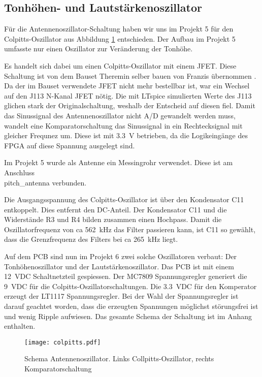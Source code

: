 \subsection{Tonhöhen- und Lautstärkenoszillator}\label{subsec:Antennenoszilator}
Für die Antennenoszillator-Schaltung haben wir uns im Projekt 5 für den Colpitts-Oszillator aus Abbildung \ref{img:colpitts} entschieden. Der Aufbau im Projekt 5 umfasste nur einen Oszillator zur Veränderung der Tonhöhe.

Es handelt sich dabei um einen Colpitts-Oszillator mit einem JFET. Diese Schaltung ist von dem Bauset \glqq Theremin selber bauen\grqq{} von Franzis übernommen \cite{Franzis}. 
Da der im Bauset verwendete JFET nicht mehr bestellbar ist, war ein Wechsel auf den J113 N-Kanal JFET nötig. Die mit LTspice simulierten Werte des J113 glichen stark der Originalschaltung, weshalb der Entscheid auf diesen fiel. 
Damit das Sinussignal des Antennenoszillator nicht A/D gewandelt werden muss, wandelt eine Komparatorschaltung das Sinussignal in ein Rechtecksignal mit gleicher Frequnez um. 
Diese ist mit \SI{3.3}{V} betrieben, da die Logikeingänge des FPGA auf diese Spannung ausgelegt sind. 

Im Projekt 5 wurde als Antenne ein Messingrohr verwendet. Diese ist am Anschluss\\ pitch\_antenna verbunden. 

Die Ausgangsspannung des Colpitts-Oszillator ist über den Kondensator C11 entkoppelt. Dies entfernt den DC-Anteil. Der Kondensator C11 und die Widerstände R3 und R4 bilden zusammen einen Hochpass. Damit die Oszillatorfrequenz von ca \SI{562}{kHz} das Filter passieren kann, ist C11 so gewählt, dass die Grenzfrequenz des Filters bei ca \SI{265}{kHz} liegt. 

Auf dem PCB sind nun im Projekt 6 zwei solche Oszillatoren verbaut: Der Tonhöhenoszillator und der Lautstärkenoszillator. Das PCB ist mit einem \SI{12} {VDC} Schaltnetzteil gespiessen. Der MC7809 Spannungsregler generiert die \SI{9} {VDC} für die Colpitts-Oszillatorschaltungen. Die \SI{3.3} {VDC} für den Komperator erzeugt der LT1117 Spannungsregler. Bei der Wahl der Spannungsregler ist darauf geachtet worden, dass die erzeugten Spannungen möglichst störungsfrei ist und wenig Ripple aufwiesen. Das gesamte Schema der Schaltung ist im Anhang enthalten.

\begin{figure}[h]
	\centering
	\texttt{[image: colpitts.pdf]}
	\caption{Schema Antennenoszillator. Links Collpitts-Oszillator, rechts Komparatorschaltung}
	\label{img:colpitts}
\end{figure} 

\clearpage


